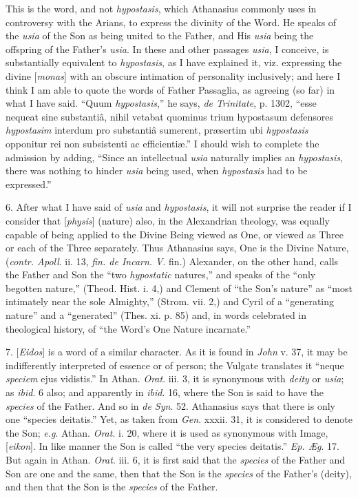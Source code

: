 This is the word, and not \emph{hypostasis}, which Athanasius
commonly uses in controversy with the Arians, to express the divinity
of the Word. He speaks of the \emph{usia} of the Son as being united
to the Father, and His \emph{usia} being the offspring of the Father's
\emph{usia}. In these and other passages \emph{usia}, I conceive, is
substantially equivalent to \emph{hypostasis}, as I have explained it,
viz. expressing the divine [\emph{monas}] with an obscure intimation
of personality inclusively; and here I think I am able to quote the
words of Father Passaglia, as agreeing (so far) in what I have said.
``Quum \emph{hypostasis},'' he says, \emph{de Trinitate}, p.
1302, ``esse nequeat sine substantiâ, nihil vetabat quominus
trium hypostasum defensores \emph{hypostasim} interdum pro substantiâ
sumerent, præsertim ubi \emph{hypostasis} opponitur rei non
subsistenti ac efficientiæ.'' I should wish to complete the
admission by adding, ``Since an intellectual \emph{usia} naturally
implies an \emph{hypostasis}, there was nothing to hinder \emph{usia}
being used, when \emph{hypostasis} had to be expressed.''

6. After what I have said of \emph{usia} and \emph{hypostasis}, it
will not surprise the reader if I consider that [\emph{physis}]
(nature) also, in the Alexandrian theology, was equally capable of
being applied to the Divine Being viewed as One, or viewed as Three or
each of the Three separately. Thus Athanasius says, One is the Divine
Nature, (\emph{contr. Apoll}. ii. 13, \emph{fin. de Incarn. V}. fin.)
Alexander, on the other hand, calls the Father and Son the ``two \emph{hypostatic}
natures,'' and speaks of the ``only begotten nature,'' (Theod.
Hist. i. 4,) and Clement of ``the Son's nature'' as ``most
intimately near the sole Almighty,'' (Strom. vii. 2,) and
Cyril of a ``generating nature'' and a ``generated'' (Thes.
xi. p. 85) and, in words celebrated in theological history, of
``the Word's One Nature incarnate.''

7. [\emph{Eidos}] is a word of a similar character. As it is found
in \emph{John} v. 37, it may be indifferently interpreted of essence
or of person; the Vulgate translates it ``neque \emph{speciem}
ejus vidistis.'' In Athan. \emph{Orat}. iii. 3, it is synonymous
with \emph{deity} or \emph{usia}; as \emph{ibid}. 6 also; and
apparently in \emph{ibid}. 16, where the Son is said to have the \emph{species}
of the Father. And so in \emph{de Syn}. 52. Athanasius says that there
is only one ``species deitatis.'' Yet, as taken from \emph{Gen}.
xxxii. 31, it is considered to denote the Son; \emph{e.g}. Athan. \emph{Orat}.
i. 20, where it is used as synonymous with Image, [\emph{eikon}]. In
like manner the Son is called ``the very species deitatis.'' \emph{Ep.
Æg}. 17. But again in Athan. \emph{Orat}. iii. 6, it is first said
that the \emph{species} of the Father and Son are one and the same,
then that the Son is the \emph{species} of the Father's (deity), and
then that the Son is the \emph{species} of the Father.

